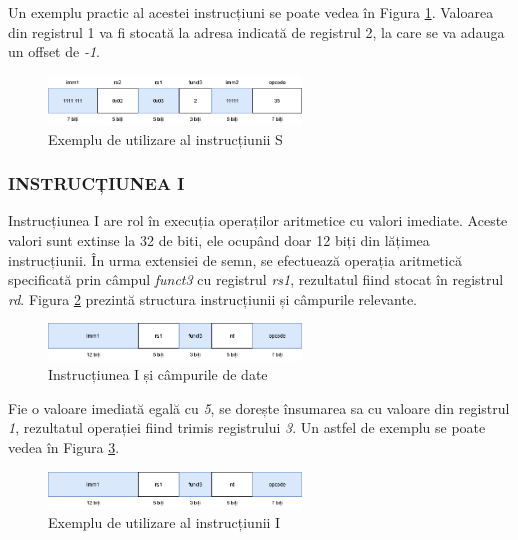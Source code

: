 \documentclass[12pt]{article}
\begin{document}
Un exemplu practic al acestei instrucțiuni se poate vedea în Figura \ref{Figura:13}. Valoarea din registrul 1 va fi stocată la adresa indicată de registrul 2, la care se va adauga un offset de \textit{-1}.

 \begin{figure}[h!]
 \includegraphics[width=0.6\textwidth]{stypeexample.png}
 \centering
 \caption{Exemplu de utilizare al instrucțiunii S}
 \label{Figura:13}
 \end{figure}
 
 \subsubsection{INSTRUCȚIUNEA I}
 Instrucțiunea I are rol în execuția operaților aritmetice cu valori imediate. Aceste valori sunt extinse la 32 de biti, ele ocupând doar 12 biți din lățimea instrucțiunii. În urma extensiei de semn, se efectuează operația aritmetică specificată prin câmpul \textit{funct3} cu registrul \textit{rs1}, rezultatul fiind stocat în registrul \textit{rd}. Figura \ref{Figura:14} prezintă structura instrucțiunii și câmpurile relevante.

 \begin{figure}[h!]
 \includegraphics[width=0.6\textwidth]{itype.png}
 \centering
 \caption{Instrucțiunea I și câmpurile de date}
 \label{Figura:14}
 \end{figure}

 Fie o valoare imediată egală cu \textit{5}, se dorește însumarea sa cu valoare din registrul \textit{1}, rezultatul operației fiind trimis registrului \textit{3}. Un astfel de exemplu se poate vedea în Figura \ref{Figura:15}.

 \begin{figure}[h!]
 \includegraphics[width=0.6\textwidth]{itype.png}
 \centering
 \caption{Exemplu de utilizare al instrucțiunii I}
 \label{Figura:15}
 \end{figure}
 
\end{document}
